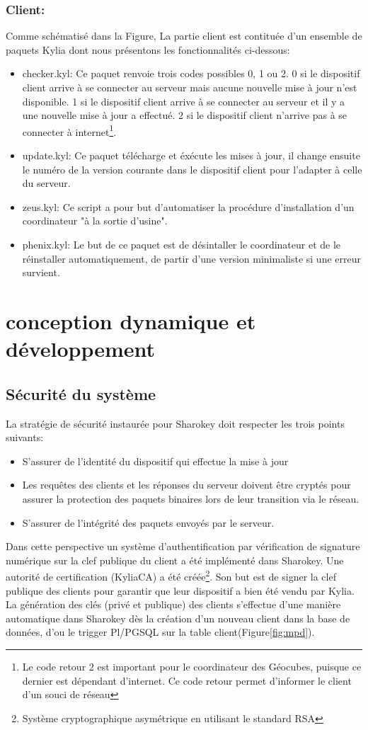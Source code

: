 \documentclass{themeensg}
\begin{document}
\subsubsection{Client:}
Comme schématisé dans la Figure, La partie client est contituée d'un ensemble de paquets Kylia dont nous présentons les fonctionnalités ci-dessous:
\begin{itemize}
\item checker.kyl: Ce paquet renvoie trois codes possibles 0, 1 ou 2. 0 si le dispositif client arrive à se connecter au serveur mais aucune nouvelle mise à jour n'est disponible. 1 si le dispositif client arrive à se connecter au serveur et il y a une nouvelle mise à jour a effectué. 2 si le dispositif client n'arrive pas à se connecter à internet\footnote{Le code retour 2 est important pour le coordinateur des Géocubes, puisque ce dernier est dépendant d'internet. Ce code retour permet d'informer le client d'un souci de réseau}.
\item update.kyl: Ce paquet télécharge et éxécute les mises à jour, il change ensuite le numéro de la version courante dans le dispositif client pour l'adapter à celle du serveur.
\item zeus.kyl: Ce script a pour but d'automatiser la procédure d'installation d'un coordinateur "à la sortie d'usine".
\item phenix.kyl: Le but de ce paquet est de désintaller le coordinateur et de le réinstaller automatiquement, de partir d'une version minimaliste si une erreur survient.
\end{itemize}
\section{conception dynamique et développement}

\subsection{Sécurité du système}
La stratégie de sécurité instaurée pour Sharokey doit respecter les trois points suivants:
\begin{itemize}
\item S'assurer de l'identité du dispositif qui effectue la mise à jour
\item Les requêtes des clients et les réponses du serveur doivent être cryptés pour assurer la protection des paquets binaires lors de leur transition via le réseau.
\item S'assurer de l'intégrité des paquets envoyés par le serveur.
\end{itemize}
Dans cette perspective un système d'authentification par vérification de signature numérique sur la clef publique du client a été implémenté dans Sharokey. Une autorité de certification (KyliaCA) a été créée\footnote{Système cryptographique asymétrique en utilisant le standard RSA}. Son but est de signer la clef publique des clients pour garantir que leur dispositif a bien été vendu par Kylia. La génération des clés (privé et publique) des clients s'effectue d'une manière automatique dans Sharokey dès la création d'un nouveau client dans la base de données, d'ou le trigger Pl/PGSQL sur la table client(Figure\ref{fig:mpd}).
\end{document}
